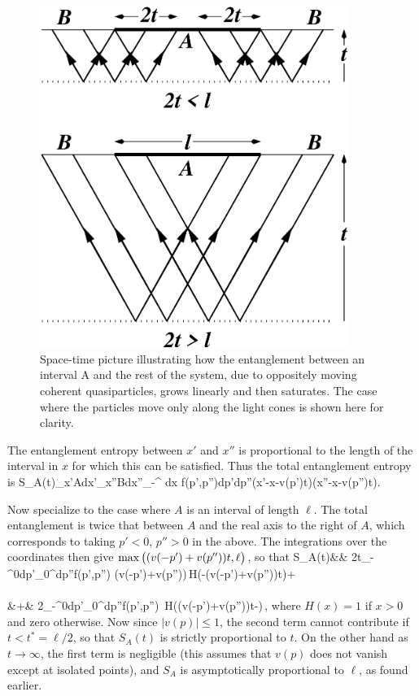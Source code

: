 \begin{figure}[t]
\centering
\includegraphics[width=10cm]{2tl.eps}
\caption{\label{fig2tl}
Space-time picture illustrating how the entanglement between
an interval A and the rest of the system,
due to oppositely moving coherent quasiparticles, grows
linearly and then saturates. The case where the particles move only
along the light cones is shown here for clarity.}
\end{figure}
The entanglement entropy between $x'$ and $x''$
is proportional to the length of the interval
in $x$ for which this can be satisfied. Thus the total entanglement
entropy is
\be
S_A(t)\approx \int_{x'\in A}dx'\int_{x''\in B}dx''\int_{-\infty}^\infty
dx\int
f(p',p'')dp'dp''\delta\big(x'-x-v(p')t\big)\delta\big(x''-x-v(p'')t\big).
\ee

Now specialize to the case where $A$ is an interval of length $\ell$.
The total entanglement is twice that
between $A$ and the real axis to the right of $A$, which corresponds to
taking $p'<0$, $p''>0$ in the above. The integrations over the
coordinates then give ${\rm max}\,\big((v(-p')+v(p''))t,\ell\big)$, so
that
\bea
S_A(t)&\approx& 2t\int_{-\infty}^0dp'\int_0^\infty dp''f(p',p'')
(v(-p')+v(p''))\,H(\ell-(v(-p')+v(p''))t)+
\nonumber\\
\nonumber\\&+&
2\ell \int_{-\infty}^0dp'\int_0^\infty dp''f(p',p'')
\,H((v(-p')+v(p''))t-\ell)\,,
\label{ppp}
\eea
where $H(x)=1$ if $x>0$ and zero otherwise. Now since $|v(p)|\leq 1$,
the second term cannot contribute if $t<t^*=\ell/2$, so that $S_A(t)$ is
strictly proportional to $t$. On the other hand as $t\to\infty$, the
first term is negligible (this assumes that $v(p)$ does not vanish
except at isolated points), and $S_A$ is asymptotically proportional to
$\ell$, as found earlier. 

